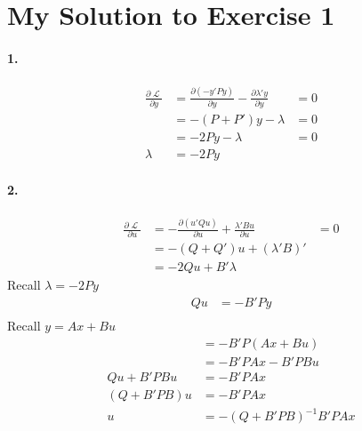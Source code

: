 \documentclass[10pt,letter]{article}
\newcommand{\Lagr}{\mathop{\mathcal{L}}}
\begin{document}
\section*{My Solution to Exercise 1}

\paragraph{1.}
\begin{align}
  \frac{ \partial \Lagr}{\partial y} & = \frac{ \partial (-y' P y)}{\partial y} - \frac{\partial \lambda' y}{\partial y} & = 0 \\
  & = -(P + P')y - \lambda & = 0 \\
  & = -2Py -\lambda & = 0 \\
  \lambda & = -2Py
\end{align}
\setcounter{equation}{0}

\paragraph{2.}
\begin{align}
  \frac{\partial \Lagr}{\partial u} & = - \frac{\partial(u' Q u)}{\partial u} + \frac{\lambda' B u}{\partial u} & = 0 \\
  & = -(Q +Q')u + (\lambda' B)' \\
  & = -2 Q u + B' \lambda
\end{align}
Recall $\lambda = -2Py$
\begin{align}
  Q u & = -B' P y \\
\end{align}
Recall $y = A x + B u$
\begin{align}
  & = -B' P (A x + B u) \\
  & = -B' P A x - B' P B u \\
  Q u + B' P B u & = -B' P A x \\
  (Q + B' P B)u & = -B' P A x \\
  u & = -(Q + B' P B)^{-1} B' P A x
\end{align}
\setcounter{equation}{0}

\iffalse
\begin{equation} \label{eq:1}
  u = -(Q + B' P B)^{-1} B' P A x
\end{equation}

\begin{equation} \label{eq:2}
  y = A x + B u
\end{equation}

\begin{equation} \label{eq:3}
  v(x) = -y' P y - u' Q u 
\end{equation}
\fi
\end{document}
